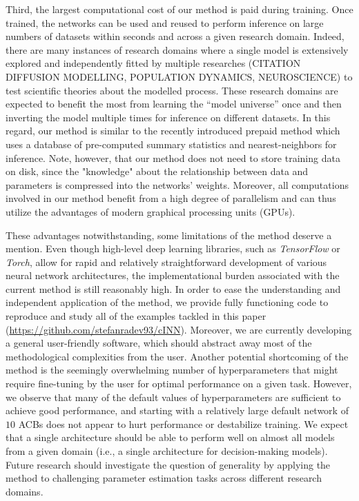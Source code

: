 \documentclass[9pt,twoside,lineno]{pnas-new}
\begin{document}
Third, the largest computational cost of our method is paid during training. Once trained, the networks can be used and reused to perform inference on large numbers of datasets within seconds and across a given research domain. Indeed, there are many instances of research domains where a single model is extensively explored and independently fitted by multiple researches (CITATION DIFFUSION MODELLING, POPULATION DYNAMICS, NEUROSCIENCE) to test scientific theories about the modelled process. These research domains are expected to benefit the most from learning the “model universe” once and then inverting the model multiple times for inference on different datasets. In this regard, our method is similar to the recently introduced prepaid method \cite{mestdagh2018prepaid} which uses a database of pre-computed summary statistics and nearest-neighbors for inference. Note, however, that our method does not need to store training data on disk, since the "knowledge" about the relationship between data and parameters is compressed into the networks' weights. Moreover, all computations involved in our method benefit from a high degree of parallelism and can thus utilize the advantages of modern graphical processing units (GPUs).

These advantages notwithstanding, some limitations of the method deserve a mention.  Even though high-level deep learning libraries, such as \textit{TensorFlow} or \textit{Torch}, allow for rapid and relatively straightforward development of various neural network architectures, the implementational burden associated with the current method is still reasonably high. In order to ease the understanding and independent application of the method, we provide fully functioning code to reproduce and study all of the examples tackled in this paper (\href{https://github.com/stefanradev93/cINN}{https://github.com/stefanradev93/cINN}). Moreover, we are currently developing a general user-friendly software, which should abstract away most of the methodological complexities from the user. Another potential shortcoming of the method is the seemingly overwhelming number of hyperparameters that might require fine-tuning by the user for optimal performance on a given task. However, we observe that many of the default values of hyperparameters are sufficient to achieve good performance, and starting with a relatively large default network of $10$ ACBs does not appear to hurt performance or destabilize training. We expect that a single architecture should be able to perform well on almost all models from a given domain (i.e., a single architecture for decision-making models). Future research should investigate the question of generality by applying the method to challenging parameter estimation tasks across different research domains.
\end{document}
